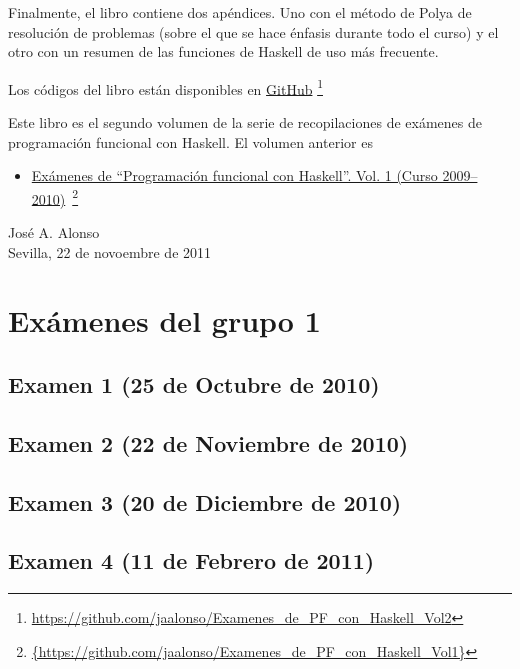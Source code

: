 \documentclass[a4paper,12pt,twoside]{book}
\begin{document}
Finalmente, el libro contiene dos apéndices. Uno con el método de Polya
de resolución de problemas (sobre el que se hace énfasis durante todo el
curso) y el otro con un resumen de las funciones de Haskell de uso más
frecuente.

Los códigos del libro están disponibles en
\href{https://github.com/jaalonso/Examenes_de_PF_con_Haskell_Vol2}
     {GitHub}
     \footnote{{\url{https://github.com/jaalonso/Examenes_de_PF_con_Haskell_Vol2}}}

Este libro es el segundo volumen de la serie de recopilaciones de
exámenes de programación funcional con Haskell. El volumen anterior es
\begin{itemize}
\item
  \href{https://github.com/jaalonso/Examenes_de_PF_con_Haskell_Vol1}
  {Exámenes de ``Programaci\'on funcional con Haskell''.
    Vol. 1 (Curso 2009--2010)}\
    \footnote{\url{{https://github.com/jaalonso/Examenes_de_PF_con_Haskell_Vol1}}}

\end{itemize}
     
\begin{flushright}
  José A. Alonso \\
  Sevilla, 22 de novoembre de 2011
\end{flushright}

\chapter{Exámenes del grupo 1}
\section{Examen 1 (25 de Octubre de 2010)}
\section{Examen 2 (22 de Noviembre de 2010)}
\section{Examen 3 (20 de Diciembre de 2010)}
\section{Examen 4 (11 de Febrero de 2011)}
\label{examen_10_11_1_4}
\end{document}
